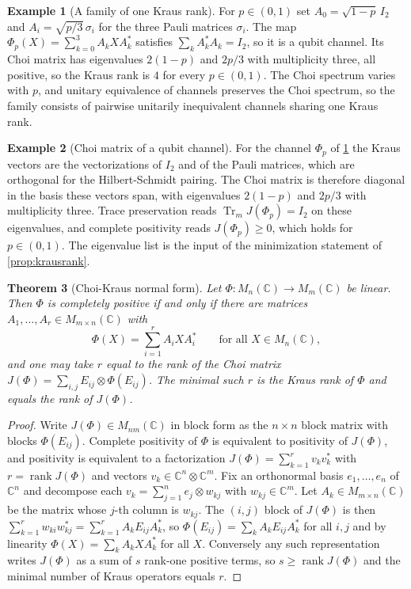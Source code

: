 \documentclass[11pt,letterpaper]{article}
\newtheorem{theorem}{Theorem}[section]
\theoremstyle{definition}
\newtheorem{example}[theorem]{Example}
\theoremstyle{remark}
\begin{document}
\begin{example}[A family of one Kraus rank]
\label{ex:depol}
For $p \in (0,1)$ set $A_0 = \sqrt{1 - p} \, I_2$ and $A_i = \sqrt{p/3} \, \sigma_i$ for the three Pauli matrices $\sigma_i$. The map $\Phi_p(X) = \sum_{k=0}^{3} A_k X A_k^*$ satisfies $\sum_k A_k^* A_k = I_2$, so it is a qubit channel. Its Choi matrix has eigenvalues $2(1 - p)$ and $2p/3$ with multiplicity three, all positive, so the Kraus rank is $4$ for every $p \in (0,1)$. The Choi spectrum varies with $p$, and unitary equivalence of channels preserves the Choi spectrum, so the family consists of pairwise unitarily inequivalent channels sharing one Kraus rank.
\end{example}

\begin{example}[Choi matrix of a qubit channel]
\label{ex:choi}
For the channel $\Phi_p$ of \cref{ex:depol} the Kraus vectors are the vectorizations of $I_2$ and of the Pauli matrices, which are orthogonal for the Hilbert-Schmidt pairing. The Choi matrix is therefore diagonal in the basis these vectors span, with eigenvalues $2(1 - p)$ and $2p/3$ with multiplicity three. Trace preservation reads $\operatorname{Tr}_m J(\Phi_p) = I_2$ on these eigenvalues, and complete positivity reads $J(\Phi_p) \geq 0$, which holds for $p \in (0,1)$. The eigenvalue list is the input of the minimization statement of \cref{prop:krausrank}.
\end{example}

\begin{theorem}[Choi-Kraus normal form]
\label{thm:kraus}
Let $\Phi: M_n(\mathbb{C}) \to M_m(\mathbb{C})$ be linear. Then $\Phi$ is completely positive if and only if there are matrices $A_1, \dots, A_r \in M_{m \times n}(\mathbb{C})$ with
\[
\Phi(X) = \sum_{i=1}^{r} A_i X A_i^* \qquad \text{for all } X \in M_n(\mathbb{C}),
\]
and one may take $r$ equal to the rank of the Choi matrix $J(\Phi) = \sum_{i,j} E_{ij} \otimes \Phi(E_{ij})$. The minimal such $r$ is the Kraus rank of $\Phi$ and equals the rank of $J(\Phi)$.
\end{theorem}

\begin{proof}
Write $J(\Phi) \in M_{nm}(\mathbb{C})$ in block form as the $n \times n$ block matrix with blocks $\Phi(E_{ij})$. Complete positivity of $\Phi$ is equivalent to positivity of $J(\Phi)$, and positivity is equivalent to a factorization $J(\Phi) = \sum_{k=1}^{r} v_k v_k^*$ with $r = \operatorname{rank} J(\Phi)$ and vectors $v_k \in \mathbb{C}^n \otimes \mathbb{C}^m$. Fix an orthonormal basis $e_1, \dots, e_n$ of $\mathbb{C}^n$ and decompose each $v_k = \sum_{j=1}^{n} e_j \otimes w_{kj}$ with $w_{kj} \in \mathbb{C}^m$. Let $A_k \in M_{m \times n}(\mathbb{C})$ be the matrix whose $j$-th column is $w_{kj}$. The $(i,j)$ block of $J(\Phi)$ is then $\sum_{k=1}^{r} w_{ki} w_{kj}^* = \sum_{k=1}^{r} A_k E_{ij} A_k^*$, so $\Phi(E_{ij}) = \sum_{k} A_k E_{ij} A_k^*$ for all $i, j$ and by linearity $\Phi(X) = \sum_{k} A_k X A_k^*$ for all $X$. Conversely any such representation writes $J(\Phi)$ as a sum of $s$ rank-one positive terms, so $s \geq \operatorname{rank} J(\Phi)$ and the minimal number of Kraus operators equals $r$.
\end{proof}
\end{document}
